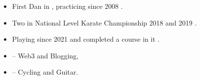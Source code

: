 \begin{itemize}

\item First Dan {\color{black}{Black Belt}} in {\color{black}{Karate}}, practicing since 2008 \hspace{0.02cm}\href{https://drive.google.com/file/d/1JoKezafJ_j58_FUGwm4_MW-CSWOgB9Iq/view?usp=sharing}{\color{coolblack}{\ExternalLink}}.
\smallskip
\item Two {\color{black}{Bronze Medals}} in National Level Karate Championship 2018 and 2019 \hspace{0.02cm}\href{https://drive.google.com/file/d/1JwTKwOhlYg8OSZzhLZ06Uf-Zfi4yDrQw/view?usp=sharing}{\color{coolblack}{\ExternalLink}}.
\smallskip
\item Playing {\color{black}{Chess}} since 2021 \hspace{0.02cm}\href{https://lichess.org/@/aaryan20004}{\color{coolblack}{\ExternalLink}} and completed a {\color{black}{Self-growth}} course in it \hspace{0.02cm}\href{https://drive.google.com/file/d/1TKWs0O4oMsfmQv2sTEXhBitCtC3n1lHn/view?usp=sharing}{\color{coolblack}{\ExternalLink}}.
\smallskip
\item {\color{black}{Areas of Interest}} -- Web3 and Blogging,
\smallskip
\item {\color{black}{Hobbies}} -- Cycling and Guitar.

\end{itemize}